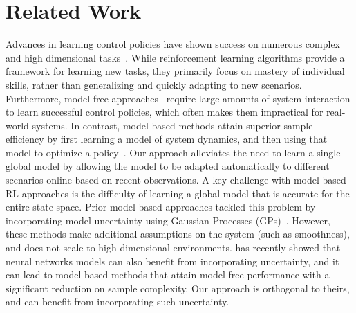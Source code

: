 \vspsec
\section{Related Work}
\vspsec
Advances in learning control policies have shown success on numerous complex and high dimensional tasks~\citep{schulman2015trust,lillicrap2015ddpg,mnih2015human,levine2016end,silver2017mastering}. While reinforcement learning algorithms provide a framework for learning new tasks, they primarily focus on mastery of individual skills, rather than generalizing and quickly adapting to new scenarios.
Furthermore, model-free approaches~\citep{peters2008reinforcement} require large amounts of system interaction to learn successful control policies, which often makes them impractical for real-world systems. In contrast, model-based methods attain superior sample efficiency by first learning a model of system dynamics, and then using that model to optimize a policy~\citep{deisenroth2013survey,lenz2015deepmpc,levine2016end,nagabandi2017roach,williams2017information}.  Our approach alleviates the need to learn a single global model by allowing the model to be adapted automatically to different scenarios online based on recent observations. A key challenge with model-based RL approaches is the difficulty of learning a global model that is accurate for the entire state space. Prior model-based approaches tackled this problem by incorporating model uncertainty using Gaussian Processes (GPs)~\citep{ko2009gp,deisenroth2011pilco, doerr2017mbpid}. However, these methods make additional assumptions on the system (such as smoothness), and does not scale to high dimensional environments.  \citet{chua2018deep} has recently showed that neural networks models can also benefit from incorporating uncertainty, and it can lead to model-based methods that attain model-free performance with a significant reduction on sample complexity. Our approach is orthogonal to theirs, and can benefit from incorporating such uncertainty.

